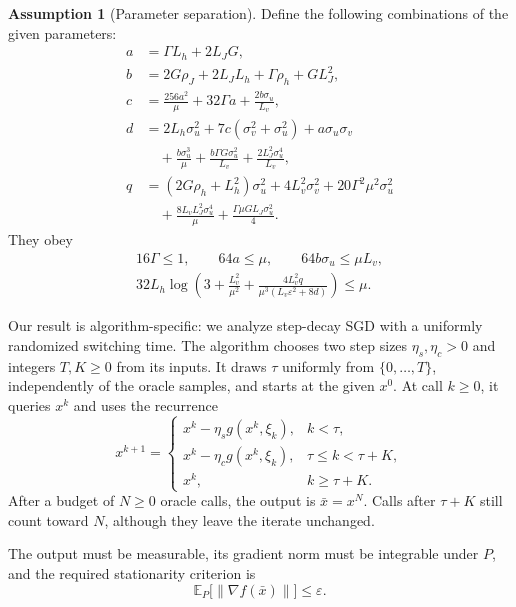 \documentclass[10pt]{article}
\theoremstyle{definition}
\newtheorem{assumption}{Assumption}
\begin{document}
\begin{assumption}[Parameter separation]
Define the following combinations of the given parameters:
\[
\begin{aligned}
a&=\Gamma L_h+2L_JG,\\
b&=2G\rho_J+2L_JL_h+\Gamma\rho_h+GL_J^2,\\
c&=\frac{256a^2}{\mu}+32\Gamma a
   +\frac{2b\sigma_u}{L_v},\\
d&=2L_h\sigma_u^2+7c(\sigma_v^2+\sigma_u^2)
   +a\sigma_u\sigma_v\\
 &\quad+\frac{b\sigma_u^3}{\mu}
   +\frac{b\Gamma G\sigma_u^2}{L_v}
   +\frac{2L_J^2\sigma_u^4}{L_v},\\
q&=(2G\rho_h+L_h^2)\sigma_u^2+4L_v^2\sigma_v^2
   +20\Gamma^2\mu^2\sigma_u^2\\
 &\quad+\frac{8L_vL_J^2\sigma_u^4}{\mu}
   +\frac{\Gamma\mu GL_J\sigma_u^2}{4}.
\end{aligned}
\]
They obey
\[
\begin{gathered}
16\Gamma\leq1,\qquad 64a\leq\mu,\qquad
64b\sigma_u\leq\mu L_v,\\
32L_h\log\left(
3+\frac{L_v^2}{\mu^2}
+\frac{4L_v^2q}{\mu^3(L_v\varepsilon^2+8d)}
\right)\leq\mu.
\end{gathered}
\]
\end{assumption}

Our result is algorithm-specific: we analyze step-decay SGD with a uniformly randomized switching time. The algorithm chooses two step sizes $\eta_s,\eta_c>0$ and integers $T,K\geq0$ from its inputs. It draws $\tau$ uniformly from $\{0,\ldots,T\}$, independently of the oracle samples, and starts at the given $x^0$. At call $k\geq0$, it queries $x^k$ and uses the recurrence
\[
x^{k+1}=\begin{cases}
x^k-\eta_s g(x^k,\xi_k),&k<\tau,\\
x^k-\eta_c g(x^k,\xi_k),&\tau\leq k<\tau+K,\\
x^k,&k\geq\tau+K.
\end{cases}
\]
After a budget of $N\geq0$ oracle calls, the output is $\bar{x}=x^N$. Calls after $\tau+K$ still count toward $N$, although they leave the iterate unchanged.

The output must be measurable, its gradient norm must be integrable under $P$, and the required stationarity criterion is
\[
\mathbb{E}_{P}\bigl[\|\nabla f(\bar{x})\|\bigr]
\leq\varepsilon.
\]
\end{document}
